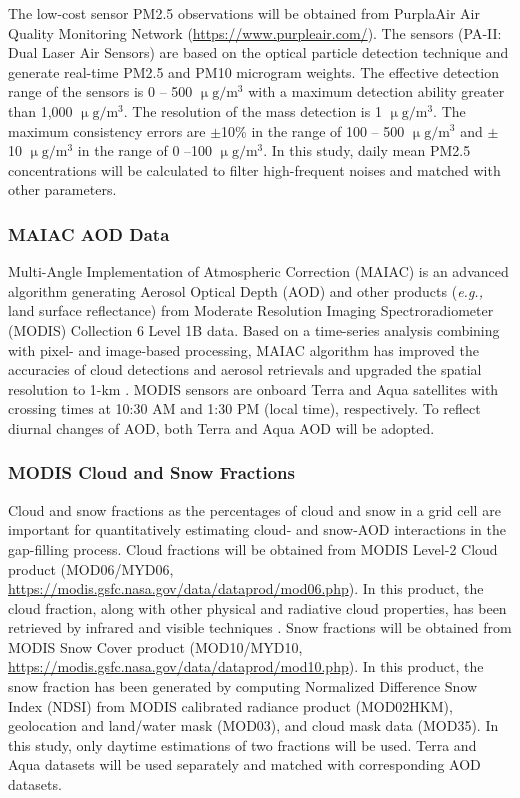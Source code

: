 \documentclass[11pt]{article}
\begin{document}
The low-cost sensor PM2.5 observations will be obtained from PurplaAir Air Quality Monitoring Network (\url{https://www.purpleair.com/}). The sensors (PA-II: Dual Laser Air Sensors) are based on the optical particle detection technique and generate real-time PM2.5 and PM10 microgram weights. The effective detection range of the sensors is 0 -- 500 $\mathrm{\upmu g/m^3}$ with a maximum detection ability greater than 1,000 $\mathrm{\upmu g/m^3}$. The resolution of the mass detection is 1 $\mathrm{\upmu g/m^3}$. The maximum consistency errors are $\pm$10\% in the range of 100 -- 500 $\mathrm{\upmu g/m^3}$ and $\pm$10 $\mathrm{\upmu g/m^3}$ in the range of 0 --100 $\mathrm{\upmu g/m^3}$. In this study, daily mean PM2.5 concentrations will be calculated to filter high-frequent noises and matched with other parameters. 

\subsubsection{MAIAC AOD Data}
Multi-Angle Implementation of Atmospheric Correction (MAIAC) is an advanced algorithm generating Aerosol Optical Depth (AOD) and other products (\textit{e.g.,} land surface reflectance) from Moderate Resolution Imaging Spectroradiometer (MODIS) Collection 6 Level 1B data. Based on a time-series analysis combining with pixel- and image-based processing, MAIAC algorithm has improved the accuracies of cloud detections and aerosol retrievals and upgraded the spatial resolution to 1-km \citep{Emili2011, Lyapustin2011, Lyapustin2012}. MODIS sensors are onboard Terra and Aqua satellites with crossing times at 10:30 AM and 1:30 PM (local time), respectively. To reflect diurnal changes of AOD, both Terra and Aqua AOD will be adopted. 

\subsubsection{MODIS Cloud and Snow Fractions}
Cloud and snow fractions as the percentages of cloud and snow in a grid cell are important for quantitatively estimating cloud- and snow-AOD interactions in the gap-filling process. Cloud fractions will be obtained from MODIS Level-2 Cloud product (MOD06/MYD06, \url{https://modis.gsfc.nasa.gov/data/dataprod/mod06.php}). In this product, the cloud fraction, along with other physical and radiative cloud properties, has been retrieved by infrared and visible techniques \citep{Platnick2015}. Snow fractions will be obtained from MODIS Snow Cover product (MOD10/MYD10, \url{https://modis.gsfc.nasa.gov/data/dataprod/mod10.php}). In this product, the snow fraction has been generated by computing Normalized Difference Snow Index (NDSI) \citep{Hall2011} from MODIS calibrated radiance product (MOD02HKM), geolocation and land/water mask (MOD03), and cloud mask data (MOD35). In this study, only daytime estimations of two fractions will be used. Terra and Aqua datasets will be used separately and matched with corresponding AOD datasets.
\end{document}
